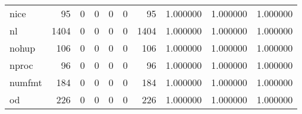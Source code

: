 \begin{longtable}{lrrrrrrrrr}
nice      &                                                 95 &                                                  0 &                                                  0 &                                                  0 &                                                  0 &                                                 95 &                                           1.000000 &                               1.000000 &                             1.000000 \\
nl        &                                               1404 &                                                  0 &                                                  0 &                                                  0 &                                                  0 &                                               1404 &                                           1.000000 &                               1.000000 &                             1.000000 \\
nohup     &                                                106 &                                                  0 &                                                  0 &                                                  0 &                                                  0 &                                                106 &                                           1.000000 &                               1.000000 &                             1.000000 \\
nproc     &                                                 96 &                                                  0 &                                                  0 &                                                  0 &                                                  0 &                                                 96 &                                           1.000000 &                               1.000000 &                             1.000000 \\
numfmt    &                                                184 &                                                  0 &                                                  0 &                                                  0 &                                                  0 &                                                184 &                                           1.000000 &                               1.000000 &                             1.000000 \\
od        &                                                226 &                                                  0 &                                                  0 &                                                  0 &                                                  0 &                                                226 &                                           1.000000 &                               1.000000 &                             1.000000 \\

\end{longtable}
